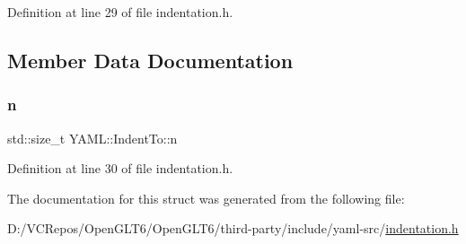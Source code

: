 Definition at line 29 of file indentation.\+h.



\subsection{Member Data Documentation}
\mbox{\label{struct_y_a_m_l_1_1_indent_to_a1764c03236ec9fbd8dca626c0e43abb6}} 
\subsubsection{\texorpdfstring{n}{n}}
{\footnotesize\ttfamily std\+::size\+\_\+t Y\+A\+M\+L\+::\+Indent\+To\+::n}



Definition at line 30 of file indentation.\+h.



The documentation for this struct was generated from the following file\+:\begin{DoxyCompactItemize}
\item 
D\+:/\+V\+C\+Repos/\+Open\+G\+L\+T6/\+Open\+G\+L\+T6/third-\/party/include/yaml-\/src/\mbox{\hyperlink{indentation_8h}{indentation.\+h}}\end{DoxyCompactItemize}

